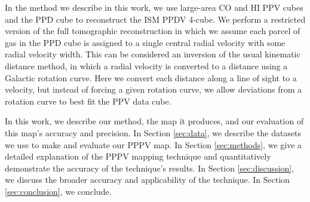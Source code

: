 In the method we describe in this work, we use large-area CO and HI PPV cubes and the \citet{Green_2015} PPD cube to reconstruct the ISM PPDV 4-cube. We perform a restricted version of the full tomographic reconstruction in which we assume each parcel of gas in the PPD cube is assigned to a single central radial velocity with some radial velocity width. This can be considered an inversion of the usual kinematic distance method, in which a radial velocity is converted to a distance using a Galactic rotation curve. Here we convert each distance along a line of sight to a velocity, but instead of forcing a given rotation curve, we allow deviations from a rotation curve to best fit the PPV data cube.

In this work, we describe our method, the map it produces, and our evaluation of this map's accuracy and precision.
In Section \ref{sec:data}, we describe the datasets we use to make and evaluate our PPPV map.
In Section \ref{sec:methods}, we give a detailed explanation of the PPPV mapping technique and quantitatively demonstrate the accuracy of the technique's results.
In Section \ref{sec:discussion}, we discuss the broader accuracy and applicability of the technique.
In Section \ref{sec:conclusion}, we conclude.
